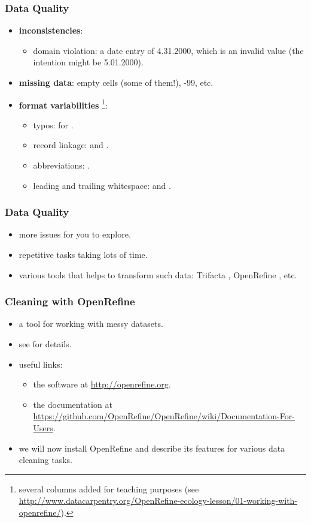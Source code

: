 \documentclass{beamer}					%
\begin{document}
 \begin{frame}[c]
  \frametitle{Data Quality}
 \begin{itemize}
 \item \textbf{inconsistencies}: 
 \begin{itemize}
 \item domain violation: a date entry of 4.31.2000, which is an invalid value (the intention might be 5.01.2000).
 \end{itemize}
 \item \textbf{missing data}: empty cells (some of them!), -99, etc. 
 \item \textbf{format variabilities} \footnote{several columns added for teaching purposes (see \footnotesize{\url{http://www.datacarpentry.org/OpenRefine-ecology-lesson/01-working-with-openrefine/}}).}: 
 \begin{itemize}
 \item typos:  for .
 \item record linkage:  and .
 \item abbreviations: . 
 \item leading and trailing whitespace:  and .
 \end{itemize}
  \end{itemize}
   \end{frame}

\begin{frame}[c]
\frametitle{Data Quality}
\begin{itemize}
 \item more issues for you to explore.
 \item repetitive tasks taking lots of time. 
 \item various tools that helps to transform such data: Trifacta \cite{Trifacta2018}, OpenRefine \cite{verborgh2013using}, etc.
\end{itemize}
\end{frame}

\begin{frame}[c]
\frametitle{Cleaning with OpenRefine}
\begin{itemize}
\item a tool for working with messy datasets.
\item see \cite{verborgh2013using} for details.
\item useful links: 
\begin{itemize}
\item the software at \footnotesize{\url{http://openrefine.org}}.
\item the documentation at \footnotesize{\url{https://github.com/OpenRefine/OpenRefine/wiki/Documentation-For-Users}}.
\end{itemize}
\item we will now install OpenRefine and describe its features for various data cleaning tasks.
\end{itemize}
\end{frame}
\end{document}
